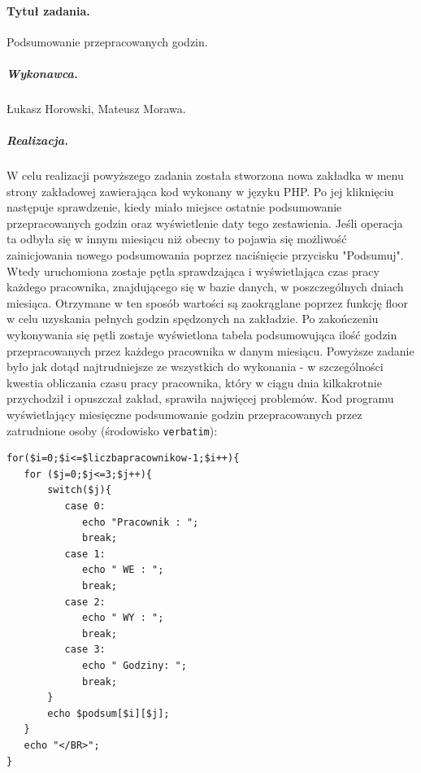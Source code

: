 \documentclass[a4paper]{article}
\begin{document}
\paragraph{Tytuł zadania.} Podsumowanie przepracowanych godzin.
\subparagraph{Wykonawca.} Łukasz Horowski, Mateusz Morawa.
\subparagraph{Realizacja.} W celu realizacji powyższego zadania została stworzona nowa zakładka w menu strony zakładowej zawierająca kod wykonany w języku PHP. Po jej kliknięciu następuje sprawdzenie, kiedy miało miejsce ostatnie podsumowanie przepracowanych godzin oraz wyświetlenie daty tego zestawienia. Jeśli operacja ta odbyła się w innym miesiącu niż obecny to pojawia się możliwość zainicjowania nowego podsumowania poprzez naciśnięcie przycisku "Podsumuj". Wtedy uruchomiona zostaje pętla sprawdzająca i wyświetlająca czas pracy każdego pracownika, znajdującego się w bazie danych, w poszczególnych dniach miesiąca. Otrzymane w ten sposób wartości są zaokrąglane poprzez funkcję floor w celu uzyskania pełnych godzin spędzonych na zakładzie. Po zakończeniu wykonywania się pętli zostaje wyświetlona tabela podsumowująca ilość godzin przepracowanych przez każdego pracownika w danym miesiącu. Powyższe zadanie było jak dotąd najtrudniejsze ze wszystkich do wykonania - w szczególności kwestia obliczania czasu pracy pracownika, który w ciągu dnia kilkakrotnie przychodził i opuszczał zakład, sprawiła najwięcej problemów.
Kod programu wyświetlający miesięczne podsumowanie godzin przepracowanych przez zatrudnione osoby (środowisko \texttt{verbatim}): \begin{verbatim}
for($i=0;$i<=$liczbapracownikow-1;$i++){
   for ($j=0;$j<=3;$j++){
       switch($j){
          case 0:
             echo "Pracownik : ";
             break;
          case 1:
             echo " WE : ";
             break;
          case 2:
             echo " WY : ";
             break;	
          case 3:
             echo " Godziny: ";
             break;
       }
       echo $podsum[$i][$j];
   }
   echo "</BR>";
}
\end{verbatim}
\end{document}
